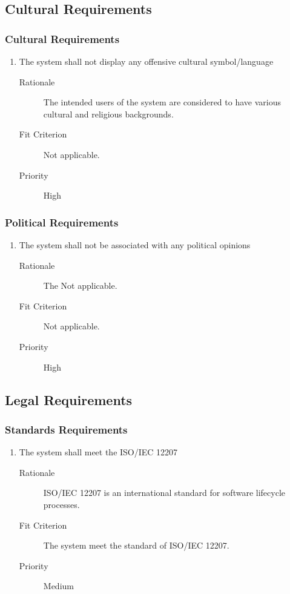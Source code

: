 \documentclass[12pt, titlepage]{article}
\begin{document}
\subsection{Cultural Requirements}
\subsubsection{Cultural Requirements}
\begin{enumerate}[resume*=NFR]
\item The system shall not display any offensive cultural symbol/language
  \begin{description}
  \item[Rationale] The intended users of the system are considered to have various
    cultural and religious backgrounds.
  \item[Fit Criterion] Not applicable.
  \item[Priority] High
  \end{description}

\end{enumerate}

\subsubsection{Political Requirements}
\begin{enumerate}[resume*=NFR]
\item The system shall not be associated with any political opinions
  \begin{description}
  \item[Rationale] The Not applicable.
  \item[Fit Criterion] Not applicable.
  \item[Priority] High
  \end{description}

\end{enumerate}
\subsection{Legal Requirements}
\subsubsection{Standards Requirements}
\begin{enumerate}[resume*=NFR]
\item The system shall meet the ISO/IEC 12207
  \begin{description}
  \item[Rationale] ISO/IEC 12207 is an international standard for software
    lifecycle processes.
  \item[Fit Criterion] The system meet the standard of ISO/IEC 12207.
  \item[Priority] Medium
  \end{description}

\end{enumerate}
\end{document}
